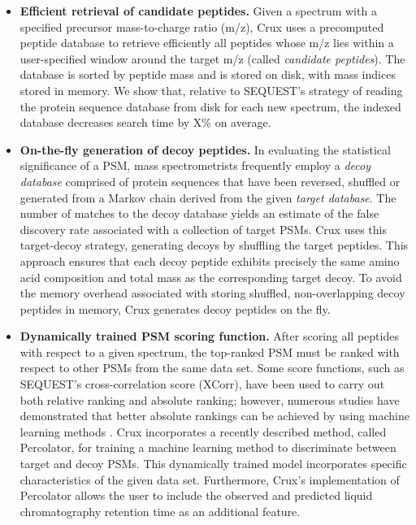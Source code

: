 \documentclass{bioinfo}
\begin{document}
\begin{itemize}

\item {\bf Efficient retrieval of candidate peptides.}  Given a
  spectrum with a specified precursor mass-to-charge ratio (m/z), Crux
  uses a precomputed peptide database to retrieve efficiently all
  peptides whose m/z lies within a user-specified window around the
  target m/z (called {\em candidate peptides}).  The database is
  sorted by peptide mass and is stored on disk, with mass indices
  stored in memory.  We show that, relative to SEQUEST's strategy of
  reading the protein sequence database from disk for each new
  spectrum, the indexed database decreases search time by X\% on
  average.

\item {\bf On-the-fly generation of decoy peptides.}  In evaluating
  the statistical significance of a PSM, mass spectrometrists
  frequently employ a {\em decoy database} comprised of protein
  sequences that have been reversed, shuffled or generated from a
  Markov chain derived from the given {\em target database}.  The
  number of matches to the decoy database yields an estimate of the
  false discovery rate associated with a collection of target PSMs.
  Crux uses this target-decoy strategy, generating decoys by shuffling
  the target peptides.  This approach ensures that each decoy peptide
  exhibits precisely the same amino acid composition and total mass as
  the corresponding target decoy.  To avoid the memory overhead
  associated with storing shuffled, non-overlapping decoy peptides in
  memory, Crux generates decoy peptides on the fly.

\item {\bf Dynamically trained PSM scoring function.}  After scoring
  all peptides with respect to a given spectrum, the top-ranked PSM
  must be ranked with respect to other PSMs from the same data set.
  Some score functions, such as SEQUEST's cross-correlation score
  (XCorr), have been used to carry out both relative ranking and
  absolute ranking; however, numerous studies have demonstrated that
  better absolute rankings can be achieved by using machine learning
  methods \cite{keller:empirical, anderson:new, elias:intensity,
  kall:semi-supervised}.  Crux incorporates a recently described
  method, called Percolator, for training a machine learning method to
  discriminate between target and decoy PSMs.  This dynamically
  trained model incorporates specific characteristics of the given
  data set.  Furthermore, Crux's implementation of Percolator allows
  the user to include the observed and predicted liquid chromatography
  retention time \cite{klammer:effect} as an additional feature.


\end{itemize}
\end{document}

